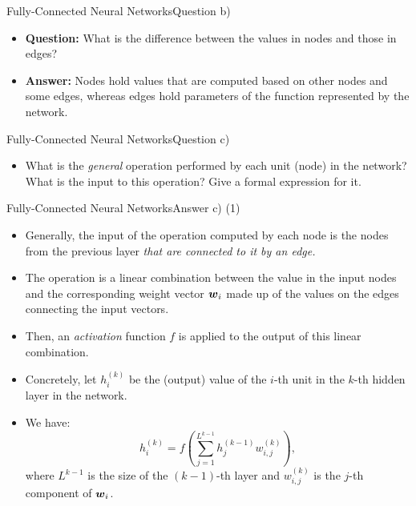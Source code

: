 \documentclass[t]{beamer}
\begin{document}
\begin{frame}{Fully-Connected Neural Networks}{Question b)}
    \begin{itemize}
        \item \textbf{Question:} What is the difference between the values in
              nodes and those in edges?
              \pause
        \item \textbf{Answer:} Nodes hold values that are computed based on
              other nodes and some edges, whereas edges hold parameters of the
              function represented by the network.
    \end{itemize}
\end{frame}

\begin{frame}{Fully-Connected Neural Networks}{Question c)}
    \begin{itemize}
        \item What is the \emph{general} operation performed
              by each unit (node) in the network? What is the input to this
              operation? Give a formal expression for it.
    \end{itemize}
\end{frame}

\begin{frame}{Fully-Connected Neural Networks}{Answer c) (1)}
    \begin{itemize}
        \item Generally, the input of the operation computed by
              each node is the nodes from the previous layer
              \emph{that are connected to it by an edge.}
        \item The operation is a linear combination between the value in
              the input nodes and the corresponding weight vector ${\boldsymbol{w}}_i$ made
              up of the values on the edges connecting the input vectors.
        \item Then, an \emph{activation} function $f$ is applied to the output
              of this linear combination.
        \item Concretely, let $h_i^{(k)}$ be the (output) value of the $i$-th
              unit in the $k$-th hidden layer in the network.
        \item We have:
              \begin{equation*}
                  h^{(k)}_i = f\left(\sum_{j=1}^{L^{k-1}}{h_j^{(k-1)} w_{i,j}^{(k)}}\right),
              \end{equation*}
              where $L^{k-1}$ is the size of the $(k-1)$-th layer and
              $w_{i,j}^{(k)}$ is the $j$-th component of ${\boldsymbol{w}}_i$.
    \end{itemize}
\end{frame}
\end{document}
